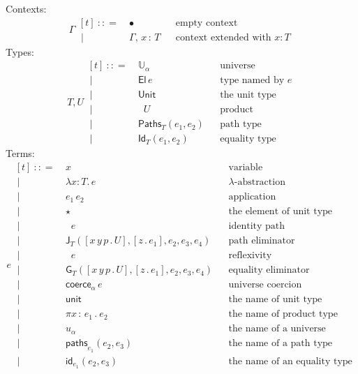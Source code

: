 \documentclass{article}
\newcommand{\G}{\Gamma} %
\newcommand{\T}{T} %
\newcommand{\U}{U} %
\newcommand{\x}{x} %
\newcommand{\e}{e} %
\newcommand{\bnf}{\ \mathrel{{:}{:}{=}}\ }
\newcommand{\bnfor}{\ \mid\ \ }
\newcommand{\ctxempty}{\bullet} %
\newcommand{\ctxextend}[3]{#1,\, #2\, {:}\, #3} %
\newcommand{\Universe}[1]{\mathbb{U}_{#1}} %
\newcommand{\El}[1]{\mathsf{El}\, #1} %
\newcommand{\Unit}{\mathsf{Unit}} %
\newcommand{\Prod}[2]{\mathop{\textstyle\prod_{(#1 {:} #2)}}} %
\newcommand{\lam}[2]{\lambda #1 {:} #2 .\,} %
\newcommand{\app}[2]{#1\,#2} %
\newcommand{\abst}[2]{[#1 \,.\, #2]} %
\newcommand{\unitTerm}{\star} %
\newcommand{\coerce}[2]{\mathsf{coerce}_{#1} \, #2}
\newcommand{\PrEqual}[3]{\mathsf{Paths}_{#1}(#2,#3)} %
\newcommand{\JuEqual}[3]{\mathsf{Id}_{#1}(#2,#3)} %
\newcommand{\PrElim}[6]{\mathsf{J}_{#1}(#2, #3, #4, #5, #6)} %
\newcommand{\JuElim}[6]{\mathsf{G}_{#1}(#2, #3, #4, #5, #6)} %
\newcommand{\prRefl}[1]{\mathop{\mathsf{idpath}_{#1}}}  %
\newcommand{\juRefl}[1]{\mathop{\mathsf{refl}_{#1}}}    %
\newcommand{\nUnit}{\mathsf{unit}} %
\newcommand{\nProd}[2]{\pi #1\,{:}\,#2 \,.\ } %
\newcommand{\nUniverse}[1]{u_{#1}}  %
\newcommand{\nPrEqual}[3]{\mathsf{paths}_{#1}(#2,#3)} %
\newcommand{\nJuEqual}[3]{\mathsf{id}_{#1}(#2,#3)} %
\begin{document}
Contexts:
%
\begin{equation*}
  \G
  \begin{aligned}[t]
    \bnf   {}& \ctxempty & & \text{empty context}\\
    \bnfor {}& \ctxextend{\G}{\x}{\T} & & \text{context extended with $x : T$}
  \end{aligned}
\end{equation*}
%
Types:
%
\begin{equation*}
  \T, \U
  \begin{aligned}[t]
    \bnf   {}& \Universe{\alpha} & & \text{universe}\\
    \bnfor {}& \El{\e} & & \text{type named by $e$}\\
    \bnfor {}& \Unit & & \text{the unit type}\\
    \bnfor {}& \Prod{x}{\T} \U & & \text{product}\\
    \bnfor {}& \PrEqual{T}{\e_1}{\e_2} & & \text{path type}\\
    \bnfor {}& \JuEqual{T}{\e_1}{\e_2} & & \text{equality type}
  \end{aligned}
\end{equation*}
%
Terms:
%
\begin{equation*}
  \e
  \begin{aligned}[t]
    \bnf   {}&  \x   &&\text{variable} \\
    \bnfor {}&  \lam{\x}{\T} \e  &&\text{$\lambda$-abstraction} \\
    \bnfor {}&   \app{\e_1}{\e_2}  &&\text{application} \\
    \bnfor {}&  \unitTerm  &&\text{the element of unit type} \\
    \bnfor {}&  \prRefl{\T}{\e}  &&\text{identity path} \\
    \bnfor {}&  \PrElim{\T}{\abst{x\,y\,p}{\U}}{\abst{z}{\e_1}}{\e_2}{\e_3}{\e_4}  &&\text{path eliminator} \\
    \bnfor {}&  \juRefl{\T}{\e}  &&\text{reflexivity} \\
    \bnfor {}&  \JuElim{\T}{\abst{x\,y\,p}{\U}}{\abst{z}{\e_1}}{\e_2}{\e_3}{\e_4}  &&\text{equality eliminator} \\
    \bnfor {}&  \coerce{\alpha}{\e}  &&\text{universe coercion} \\
    \bnfor {}&  \nUnit  &&\text{the name of unit type} \\
    \bnfor {}&  \nProd{\x}{\e_1} \e_2  &&\text{the name of product type} \\
    \bnfor {}&  \nUniverse{\alpha} &&\text{the name of a universe} \\
    \bnfor {}&  \nPrEqual{\e_1}{\e_2}{\e_3}  &&\text{the name of a path type} \\
    \bnfor {}&  \nJuEqual{\e_1}{\e_2}{\e_3}  &&\text{the name of an equality type}
  \end{aligned}
\end{equation*}
\end{document}
